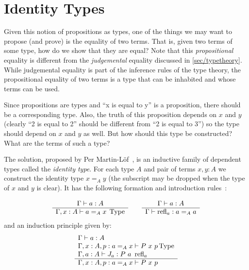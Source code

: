 \section{Identity Types}\label{sec/identitytypes}

Given this notion of propositions as types, one of the things we may want to
propose (and prove) is the equality of two terms. That is, given two terms of
some type, how do we show that they are equal? Note that this
\emph{propositional} equality is different from the \emph{judgemental} equality
discussed in \autoref{sec/typetheory}. While judgemental equality is part of the
inference rules of the type theory, the propositional equality of two terms is a
type that can be inhabited and whose terms can be used. 

Since propositions are types and ``x is equal to y'' is a proposition, there
should be a corresponding type. Also, the truth of this proposition depends on
$x$ and $y$ (clearly ``2 is equal to 2'' should be different from ``2 is equal
to 3'') so the type should depend on $x$ and $y$ as well. But how should this
type be constructed? What are the terms of such a type?

The solution, proposed by Per Martin-Löf~\cite{ML75}, is an inductive family of dependent
types called the \emph{identity type}. For each type $A$ and pair of terms
$x,y:A$ we construct the identity type $x =_A y$ (the subscript may be dropped
when the type of $x$ and $y$ is clear). It has the following formation and introduction
rules~\cite{Rijke2019}:

\[
  \begin{array}[t]{c}
    \Gamma \vdash a:A\\
    \hline
    \Gamma, x:A \vdash a =_A x \; \operatorname{Type}\\
  \end{array}
  \qquad
  \begin{array}[t]{c}
    \Gamma \vdash a:A\\
    \hline
    \Gamma \vdash \operatorname{refl}_a : a =_A a
  \end{array}
\]
and an induction principle given by:
\[
  \begin{array}[t]{l}
    \Gamma \vdash a:A\\
    \Gamma, x:A, p:a =_A x \vdash P~x~p \operatorname{Type}\\
    \Gamma, a:A \vdash J_a : P~a~\operatorname{refl}_a\\
    \hline
    \Gamma, x:A, p:a=_Ax \vdash P~x~p
  \end{array}
\]

